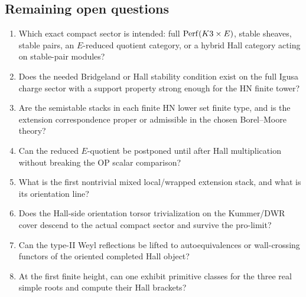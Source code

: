 \subsection{Remaining open questions}

\begin{enumerate}
\item Which exact compact sector is intended: full \(\operatorname{Perf}(K3\times E)\),
stable sheaves, stable pairs, an \(E\)-reduced quotient category, or a
hybrid Hall category acting on stable-pair modules?
\item Does the needed Bridgeland or Hall stability condition exist on
the full Igusa charge sector with a support property strong enough for
the HN finite tower?
\item Are the semistable stacks in each finite HN lower set finite type,
and is the extension correspondence proper or admissible in the chosen
Borel--Moore theory?
\item Can the reduced \(E\)-quotient be postponed until after Hall
multiplication without breaking the OP scalar comparison?
\item What is the first nontrivial mixed local/wrapped extension stack,
and what is its orientation line?
\item Does the Hall-side orientation torsor trivialization on the
Kummer/DWR cover descend to the actual compact sector and survive the
pro-limit?
\item Can the type-II Weyl reflections be lifted to autoequivalences or
wall-crossing functors of the oriented completed Hall object?
\item At the first finite height, can one exhibit primitive classes for
the three real simple roots and compute their Hall brackets?
\end{enumerate}
